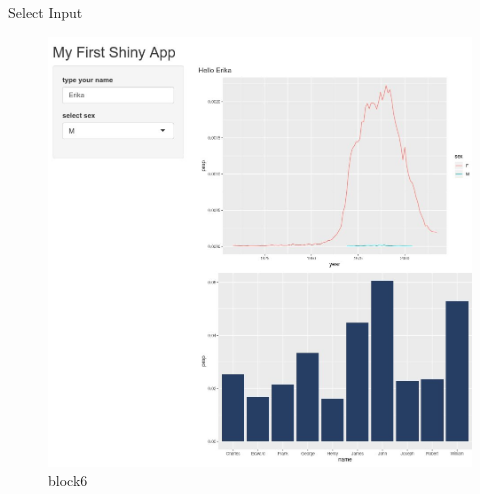 \documentclass[
  ignorenonframetext,
]{beamer}
\begin{document}
\begin{frame}{Select Input}
\protect\hypertarget{select-input}{}

\begin{figure}
\centering
\includegraphics{images/select.jpg}
\caption{block6}
\end{figure}

\end{frame}
\end{document}
